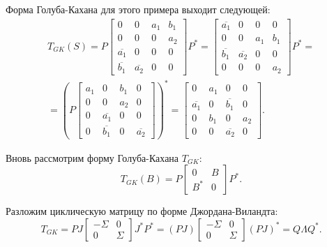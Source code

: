 \begin{example}
Форма Голуба-Кахана для этого примера выходит следующей:
\begin{equation*}
    \begin{split}
        T_{GK}(S)=P\begin{bmatrix} 0 & 0& a_1 & b_1 \\ 0 & 0 & 0 & a_2 \\ \overline{a_1} & 0 & 0 & 0 \\ \overline{b_1} & \overline{a_2} & 0 & 0  \end{bmatrix}P^*
        =
        \begin{bmatrix} \overline{a_1} & 0& 0 & 0 \\ 0 & 0 & a_1 & b_1 \\ \overline{b_1} & \overline{a_2} & 0 & 0 \\ 0 & 0 & 0 & a_2  \end{bmatrix}P^*=\\[6pt]=\left(P\begin{bmatrix} a_1 & 0& b_1 & 0 \\ 0 & 0 &  a_2 & 0 \\ 0 & \overline{a_1} & 0 & 0 \\ 0 & \overline{b_1} & 0 & \overline{a_2}  \end{bmatrix}\right)^*= \begin{bmatrix} 0 & a_1 & 0 & 0 \\ \overline{a_1} & 0 & \overline{b_1} & 0 \\ 0 & b_1 & 0 & a_2 \\ 0 & 0 & \overline{a_2} & 0  \end{bmatrix}.
        \end{split} 
    \end{equation*}
\end{example}

Вновь рассмотрим  форму Голуба-Кахана \(T_{GK}\):
\begin{equation}
T_{GK} (B) = P \begin{bmatrix} 0 & B \\ B^* & 0 \end{bmatrix} P^* .
\end{equation}

Разложим циклическую матрицу по форме Джордана-Виландта:
\begin{equation}
T_{GK} = P J\begin{bmatrix} -\Sigma & 0 \\ 0 & \Sigma \end{bmatrix}J^* P^* = (PJ) \begin{bmatrix} -\Sigma & 0 \\ 0 & \Sigma \end{bmatrix} (PJ)^*=Q\Lambda Q^*.
\end{equation}

